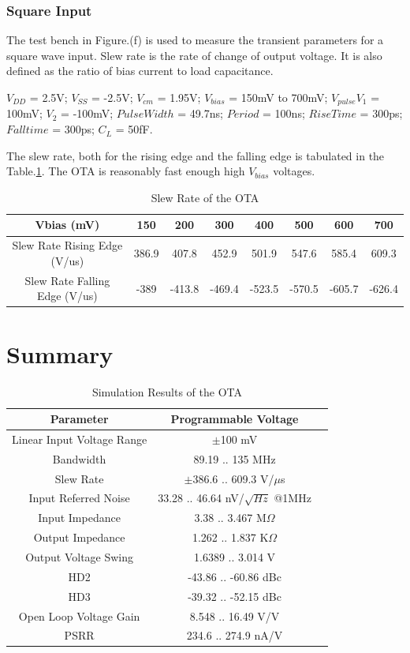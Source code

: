 \subsubsection{Square Input}
The test bench in Figure.(f) is used to measure the transient parameters for a square wave input. Slew rate is the rate of change of output voltage. It is also defined as the ratio of bias current to load capacitance.

$V_{DD}$ = 2.5V; $V_{SS}$ = -2.5V; $V_{cm}$ = 1.95V; $V_{bias}$ = 150mV to 700mV;  $V_{pulse} V_1$ = 100mV; $V_2$ = -100mV; $Pulse Width$ = 49.7ns; $Period$ = 100ns; $Rise Time$ = 300ps; $Fall time$ = 300ps; $C_{L}$ = 50fF.

The slew rate, both for the rising edge and the falling edge is tabulated in the Table.\ref{tab:OTA_Slew}. The OTA is reasonably fast enough high $V_{bias}$ voltages.

\begin{table} [H]
\centering
\begin{tabular}{@{}cccccccc@{}}
\toprule
Vbias (mV)					& 150			& 200			& 300			& 400			& 500			& 600			& 700 \\ \midrule
Slew Rate Rising Edge (V/us)			& 386.9		& 407.8		& 452.9		& 501.9 	& 547.6		& 585.4		& 609.3 \\
Slew Rate Falling Edge (V/us)			& -389		& -413.8		& -469.4		& -523.5		& -570.5		& -605.7		& -626.4 \\
\bottomrule
\end{tabular}
\caption{Slew Rate of the OTA}
\label{tab:OTA_Slew}
\end{table}

\section{Summary}
\begin{table} [H]
\centering
\begin{tabular}{@{}ccc@{}}
\toprule
Parameter						& Programmable Voltage	\\ \midrule
Linear Input Voltage Range		& $\pm$100 mV			\\
Bandwidth						& 89.19 .. 135 MHz				\\
Slew Rate						& $\pm$386.6 .. 609.3 V/$\mu$s	\\
Input Referred Noise			& 33.28 .. 46.64 nV/$\sqrt{Hz}$ @1MHz \\
Input Impedance					& 3.38 .. 3.467 M$\Omega$		\\
Output Impedance				& 1.262 .. 1.837 K$\Omega$		\\
Output Voltage Swing			& 1.6389 .. 3.014 V				\\
HD2								& -43.86 .. -60.86 dBc			\\
HD3								& -39.32 .. -52.15 dBc			\\
Open Loop Voltage Gain			& 8.548 .. 16.49 V/V			\\
PSRR							& 234.6 .. 274.9 nA/V			\\
\bottomrule
\end{tabular}
\caption{Simulation Results of the OTA}
\label{tab:Results}
\end{table}

